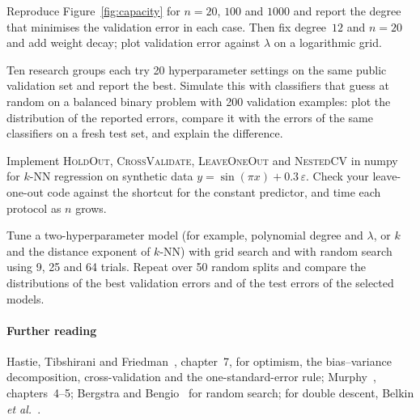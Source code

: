 \documentclass[11pt]{article}
\begin{document}
\begin{questions}
\begin{programming}
\item Reproduce Figure~\ref{fig:capacity} for $n = 20$, $100$ and $1000$ and report the degree that minimises the
validation error in each case. Then fix degree~$12$ and $n = 20$ and add weight decay; plot validation error against
$\lambda$ on a logarithmic grid.
\item Ten research groups each try 20 hyperparameter settings on the same public validation set and report the best.
Simulate this with classifiers that guess at random on a balanced binary problem with 200 validation examples:
plot the distribution of the reported errors, compare it with the errors of the same classifiers on a fresh test set,
and explain the difference.
\item Implement \textsc{HoldOut}, \textsc{CrossValidate}, \textsc{LeaveOneOut} and \textsc{NestedCV} in numpy for
$k$-NN regression on synthetic data $y = \sin(\pi x) + 0.3\,\varepsilon$. Check your leave-one-out code against the
shortcut for the constant predictor, and time each protocol as $n$ grows.
\item Tune a two-hyperparameter model (for example, polynomial degree and $\lambda$, or $k$ and the distance exponent of
$k$-NN) with grid search and with random search using 9, 25 and 64 trials. Repeat over 50 random splits and compare
the distributions of the best validation errors and of the test errors of the selected models.
\end{programming}
\end{questions}

\paragraph{Further reading} Hastie, Tibshirani and Friedman~\cite{hastie2009}, chapter~7, for optimism, the
bias--variance decomposition, cross-validation and the one-standard-error rule; Murphy~\cite{murphy2022},
chapters~4--5; Bergstra and Bengio~\cite{bergstra2012} for random search; for double descent, Belkin
\emph{et al.}~\cite{belkin2019}.
\end{document}

